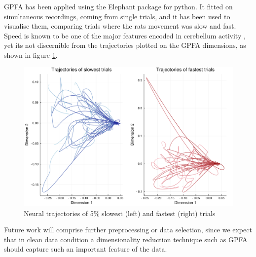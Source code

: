 GPFA has been applied using the Elephant \cite{elephant18} package for python. It fitted on simultaneous recordings, coming from single trials, and it has been used to visualise them, comparing trials where the rats movement was slow and fast. 
Speed is known to be one of the major features encoded in cerebellum activity \cite{becker2019cerebellar}, yet its not discernible from the trajectories plotted on the GPFA dimensions, as shown in figure \ref{fig:gpfa-speed}.
\begin{figure}[h!]
	\centering
	\includegraphics[scale=0.5]{../../plots/gpfa-slow-vs-fast.pdf}
	\caption{Neural trajectories of 5\% slowest (left) and fastest (right) trials}
	\label{fig:gpfa-speed}
\end{figure}
Future work will comprise further preprocessing or data selection, since we expect that in clean data condition a dimensionality reduction technique such as GPFA should capture such an important feature of the data.





